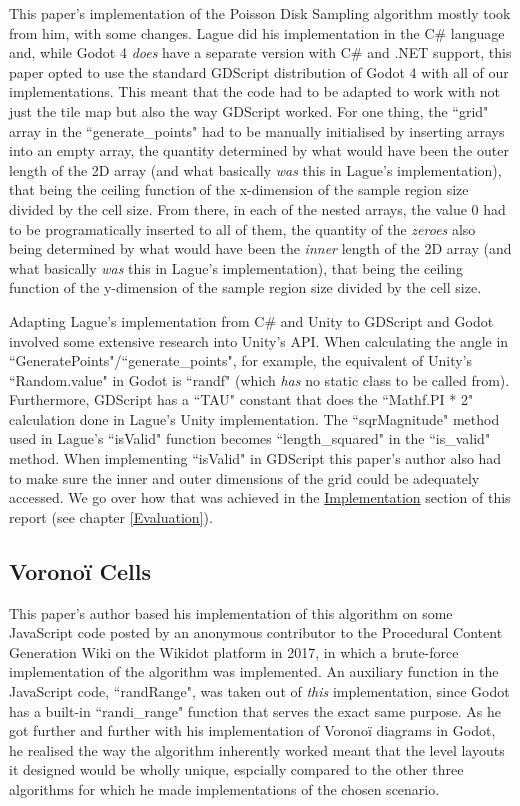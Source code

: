 This paper's implementation of the Poisson Disk Sampling algorithm mostly took from him, with some changes. Lague did his implementation in the C\# language and, while Godot 4 \textit{does} have a separate version with C\# and .NET support, this paper opted to use the standard GDScript distribution of Godot 4 with all of our implementations. This meant that the code had to be adapted to work with not just the tile map but also the way GDScript worked. For one thing, the ``grid" array in the ``generate\_points" had to be manually initialised by inserting arrays into an empty array, the quantity determined by what would have been the outer length of the 2D array (and what basically \textit{was} this in Lague's implementation), that being the ceiling function of the x-dimension of the sample region size divided by the cell size. From there, in each of the nested arrays, the value 0 had to be programatically inserted to all of them, the quantity of the \textit{zeroes} also being determined by what would have been the \textit{inner} length of the 2D array (and what basically \textit{was} this in Lague's implementation), that being the ceiling function of the y-dimension of the sample region size divided by the cell size.

Adapting Lague's implementation from C\# and Unity to GDScript and Godot involved some extensive research into Unity's API. When calculating the angle in ``GeneratePoints"/``generate\_points", for example, the equivalent of Unity's ``Random.value" in Godot is ``randf" (which \textit{has} no static class to be called from). Furthermore, GDScript has a ``TAU" constant that does the ``Mathf.PI * 2" calculation done in Lague's Unity implementation. The ``sqrMagnitude" method used in Lague's ``isValid" function becomes ``length\_squared" in the ``is\_valid" method. When implementing ``isValid" in GDScript this paper's author also had to make sure the inner and outer dimensions of the grid could be adequately accessed. We go over how that was achieved in the \hyperref[Implementation]{Implementation} section of this report (see chapter \ref{Evaluation}).

\subsection{Voronoï Cells} \label{voronoi1}

This paper's author based his implementation of this algorithm on some JavaScript code posted by an anonymous contributor to the Procedural Content Generation Wiki on the Wikidot platform in 2017, in which a brute-force implementation of the algorithm was implemented.\cite{pcgwikivoronoi} An auxiliary function in the JavaScript code, ``randRange", was taken out of \textit{this} implementation, since Godot has a built-in ``randi\_range" function that serves the exact same purpose.\cite{gdscriptdocs} As he got further and further with his implementation of Voronoï diagrams in Godot, he realised the way the algorithm inherently worked meant that the level layouts it designed would be wholly unique, espcially compared to the other three algorithms for which he made implementations of the chosen scenario.

